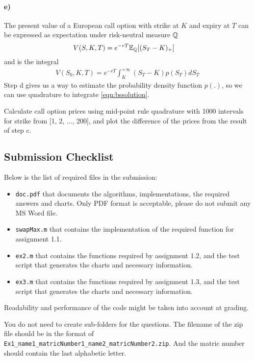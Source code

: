 \documentclass[11pt,a4paper,hidelinks,fleqn]{article}            %
\begin{document}
\paragraph{e)}

The present value of a European call option with strike at $K$ and expiry at $T$ can be expressed as expectation under risk-neutral measure $\mathbb{Q}$
\begin{align*}
V(S, K, T) & = e^{-rT}\mathbb{E}_{\mathbb{Q}} [(S_T - K)_+]
\end{align*}
and is the integral
\begin{align}
\label{eqn:bssolution}
  V(S_0, K, T) = e^{-rT}\int_K^{+\infty} \left(S_T - K\right) p(S_T) dS_T 
\end{align}
Step d gives us a way to estimate the probability density function $p(.)$,
so we can use quadrature to integrate \eqref{eqn:bssolution}. 

Calculate call option prices using mid-point rule quadrature with 1000 intervals for strike from [1, 2, ..., 200],
and plot the difference of the prices from the result of step c.

\subsection*{Submission Checklist}
Below is the list of required files in the submission:
\begin{itemize}
\item \verb=doc.pdf= that documents the algorithms, implementations, the required answers and charts. Only PDF format is acceptable, please do not submit any MS Word file.
\item \verb=swapMax.m=  that contains the implementation of the required function for assignment 1.1.
\item \verb=ex2.m= that contains the functions required by assignment 1.2, and the test script that generates the charts and necessary information.
\item \verb=ex3.m= that contains the functions required by assignment 1.3, and the test script that generates the charts and necessary information.
\end{itemize}
Readability and performance of the code might be taken into account at grading.

You do not need to create sub-folders for the questions. 
The filename of the zip file should be in the format of \verb=Ex1_name1_matricNumber1_name2_matricNumber2.zip=.
And the matric number should contain the last alphabetic letter.
\end{document}

